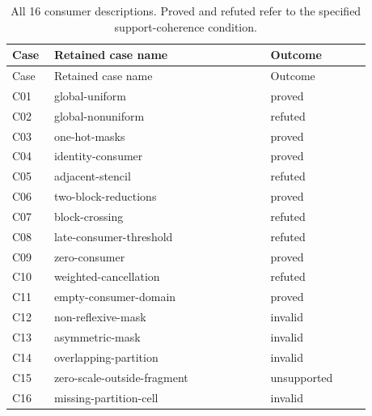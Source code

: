 \begin{longtable}{@{}p{0.09\linewidth}p{0.54\linewidth}p{0.25\linewidth}@{}}
\caption{All 16 consumer descriptions. Proved and refuted refer to the specified support-coherence condition.}\label{tab:consumer-catalog}\\
\toprule Case & Retained case name & Outcome\\\midrule\endfirsthead
\toprule Case & Retained case name & Outcome\\\midrule\endhead
\bottomrule\endfoot
C01 & global-uniform & proved\\
C02 & global-nonuniform & refuted\\
C03 & one-hot-masks & proved\\
C04 & identity-consumer & proved\\
C05 & adjacent-stencil & refuted\\
C06 & two-block-reductions & proved\\
C07 & block-crossing & refuted\\
C08 & late-consumer-threshold & refuted\\
C09 & zero-consumer & proved\\
C10 & weighted-cancellation & refuted\\
C11 & empty-consumer-domain & proved\\
C12 & non-reflexive-mask & invalid\\
C13 & asymmetric-mask & invalid\\
C14 & overlapping-partition & invalid\\
C15 & zero-scale-outside-fragment & unsupported\\
C16 & missing-partition-cell & invalid\\
\end{longtable}

